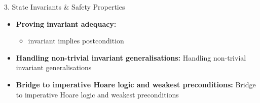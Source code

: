 \documentclass[compress,10pt,xcolor=dvipsnames]{beamer}
\begin{document}
\begin{frame}{3. State Invariants & Safety Properties}

\begin{itemize}
  \item \textbf{Proving invariant adequacy:}
    \begin{itemize}
      \item invariant implies postcondition
    \end{itemize}
  \item \textbf{Handling non-trivial invariant generalisations:} Handling non-trivial invariant generalisations
  \item \textbf{Bridge to imperative Hoare logic and weakest preconditions:} Bridge to imperative Hoare logic and weakest preconditions
\end{itemize}
\end{frame}
\end{document}
